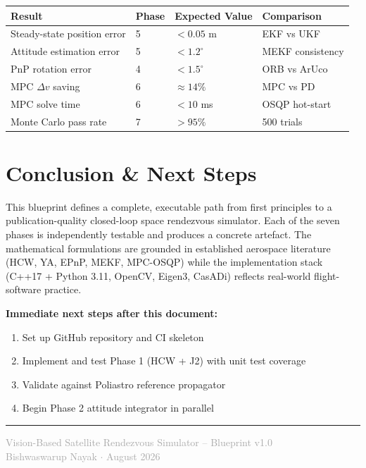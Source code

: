 \documentclass[12pt, a4paper]{article}
\newcommand{\Deltav}{\Delta v}
\begin{document}
\begin{center}
\renewcommand{\arraystretch}{1.3}
\begin{tabular}{llll}
\toprule
\textbf{Result} & \textbf{Phase} & \textbf{Expected Value} & \textbf{Comparison} \\
\midrule
Steady-state position error & 5 & $< 0.05$ m & EKF vs UKF \\
Attitude estimation error   & 5 & $< 1.2^\circ$ & MEKF consistency \\
PnP rotation error          & 4 & $< 1.5^\circ$ & ORB vs ArUco \\
MPC $\Deltav$ saving            & 6 & $\approx 14\%$ & MPC vs PD \\
MPC solve time              & 6 & $< 10$ ms     & OSQP hot-start \\
Monte Carlo pass rate       & 7 & $> 95\%$      & 500 trials \\
\bottomrule
\end{tabular}
\end{center}

\section{Conclusion \& Next Steps}

This blueprint defines a complete, executable path from first principles
to a publication-quality closed-loop space rendezvous simulator.
Each of the seven phases is independently testable and produces a
concrete artefact. The mathematical formulations are grounded in
established aerospace literature (HCW, YA, EPnP, MEKF, MPC-OSQP)
while the implementation stack (C++17 + Python 3.11, OpenCV, Eigen3,
CasADi) reflects real-world flight-software practice.

\textbf{Immediate next steps after this document:}
\begin{enumerate}[leftmargin=2em]
    \item Set up GitHub repository and CI skeleton
    \item Implement and test Phase 1 (HCW + J2) with unit test coverage
    \item Validate against Poliastro reference propagator
    \item Begin Phase 2 attitude integrator in parallel
\end{enumerate}

\vspace{1em}
\hrule
\vspace{0.5em}
\begin{center}
\small\textcolor{darkgray}{
Vision-Based Satellite Rendezvous Simulator -- Blueprint v1.0\\
Bishwaswarup Nayak $\cdot$ August 2026}
\end{center}
\end{document}
